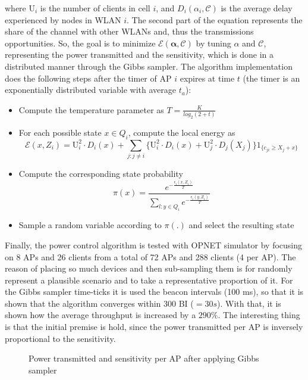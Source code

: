 \documentclass[12pt, a4paper,twoside]{tesi_upf}
\begin{document}
			where $\text{U}_i$ is the number of clients in cell $i$, and $D_i(\alpha_i, \mathcal{C})$ is the average delay experienced by nodes in WLAN $i$. The second part of the equation represents the share of the channel with other WLANs and, thus the transmissions opportunities. So, the goal is to minimize $\mathcal{E}(\boldsymbol{\alpha},\mathcal{C})$ by tuning $\alpha$ and $\mathcal{C}$, representing the power transmitted and the sensitivity, which is done in a distributed manner through the Gibbs sampler. The algorithm implementation does the following steps after the timer of AP $i$ expires at time $t$ (the timer is an exponentially distributed variable with average $t_a$):
			\begin{itemize}
				\item Compute the temperature parameter as $T=\frac{K}{log_2(2+t)}$
				\item For each possible state $x \in Q_i$, compute the local energy as 
				$$\mathcal{E}(x,Z_i) = \text{U}_i^2 \cdot D_i(x) + \sum_{j:j\neq i} \Big\{ \text{U}_i^2 \cdot D_i(x) + \text{U}_j^2 \cdot D_j(X_j)\Big\} 1_{\Big\{ c_{ji}  \geq X_j + x \Big\} }$$
				\item Compute the corresponding state probability
				$$\pi(x) = \frac{e^{-\frac{\epsilon_i(x,Z_i)}{T}}}{\sum_{l:y\in Q_i} e^{-\frac{\epsilon_i(y,Z_i)}{T}}}$$	
				\item Sample a random variable according to $\pi(.)$ and select the resulting state
			\end{itemize}
			
			Finally, the power control algorithm is tested with OPNET simulator by focusing on 8 APs and 26 clients from a total of 72 APs and 288 clients (4 per AP). The reason of placing so much devices and then sub-sampling them is for randomly represent a plausible scenario and to take a representative proportion of it. For the Gibbs sampler time-ticks it is used the beacon intervals (100 ms), so that it is shown that the algorithm converges within 300 BI ($=30 s$). With that, it is shown how the average throughput is increased by a $290\%$. The interesting thing is that the initial premise is hold, since the power transmitted per AP is inversely proportional to the sensitivity.
			
			\begin{figure}[h!]
				\centering
				\caption{Power transmitted and sensitivity per AP after applying Gibbs sampler}
				\label{fig:gibbs_results}
			\end{figure}
		
\end{document}
